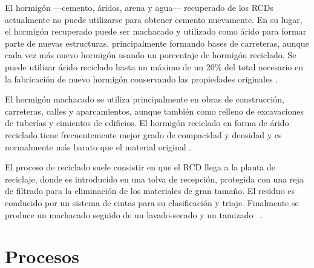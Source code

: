 El hormigón —cemento, áridos, arena y agua— recuperado de los RCDs actualmente no puede utilizarse para obtener cemento nuevamente. En su lugar, el hormigón recuperado puede ser machacado y utilizado como árido para formar parte de nuevas estructuras, principalmente formando bases de carreteras, aunque cada vez más nuevo hormigón usando un porcentaje de hormigón reciclado. Se puede utilizar árido reciclado hasta un máximo de un 20\% del total necesario en la fabricación de nuevo hormigón conservando las propiedades originales \cite{europeanconcrete}.

El hormigón machacado se utiliza principalmente en obras de construcción, carreteras, calles y aparcamientos, aunque también como relleno de excavaciones de tuberías y cimientos de edificios. El hormigón reciclado en forma de árido reciclado tiene frecuentemente mejor grado de compacidad y densidad y es normalmente más barato que el material original \cite{europeanconcrete}.

El proceso de reciclado suele consistir en que el RCD llega a la planta de reciclaje, donde es introducido en una tolva de recepción, protegida con una reja de filtrado para la eliminación de los materiales de gran tamaño. El residuo es conducido por un sistema de cintas para su clasificación y triaje. Finalmente se produce un machacado seguido de un lavado-secado y un tamizado \cite{monografia} \cite{gerd}.

\section{Procesos}





